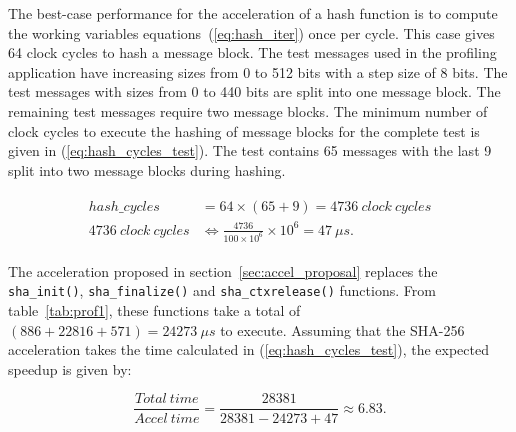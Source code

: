 The best-case performance for the acceleration of a hash function is to compute
the working variables equations~(\ref{eq:hash_iter}) once per cycle. This case
gives 64 clock cycles to hash a message block. 
The test messages used in the profiling application have increasing sizes from
0 to 512 bits with a step size of 8 bits. The test messages with sizes from 0
to 440 bits are split into one message block. The remaining test messages
require two message blocks. 
The minimum number of clock cycles to execute the hashing of message blocks for
the complete test is given in (\ref{eq:hash_cycles_test}). The test contains 65
messages with the last 9 split into two message blocks during hashing.

\begin{align}
    \begin{split}
    hash\_cycles &= 64 \times ( 65 + 9 ) = 4736 \ clock \ cycles \\
    4736 \ clock \ cycles &\Leftrightarrow \frac{4736}{100\times 10^{6}}\times 10^{6} = 47 \ \mu s.
    \end{split}
\label{eq:hash_cycles_test}
\end{align}

The acceleration proposed in section~\ref{sec:accel_proposal} replaces the 
\texttt{sha\_init()}, \texttt{sha\_finalize()} and \texttt{sha\_ctxrelease()} 
functions. From table~\ref{tab:prof1}, these functions take a total of 
$ (886 + 22816 + 571) = 24273 \ \mu s$ to execute. Assuming that the SHA-256
acceleration takes the time calculated in (\ref{eq:hash_cycles_test}), the
expected speedup is given by:

\begin{equation}
    \frac{Total\ time}{Accel\ time} = \frac{28381}{28381 - 24273 + 47} \approx 6.83.
\label{eq:expected_speedup}
\end{equation}
